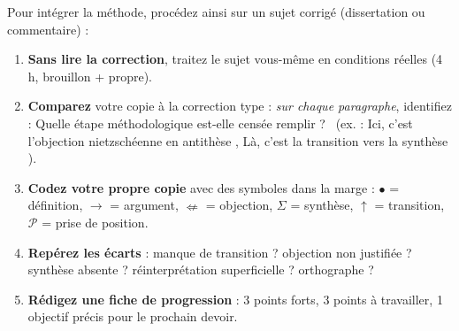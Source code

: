 \documentclass[11pt]{article}
\begin{document}
\begin{methode}
Pour intégrer la méthode, procédez ainsi sur un sujet corrigé (dissertation ou commentaire) :
\begin{enumerate}
    \item \textbf{Sans lire la correction}, traitez le sujet vous-même en conditions réelles (4 h, brouillon + propre).
    \item \textbf{Comparez} votre copie à la correction type : \emph{sur chaque paragraphe}, identifiez : \guillemotleft Quelle étape méthodologique est-elle censée remplir ? \guillemotright\ (ex. : \guillemotleft Ici, c'est l'objection nietzschéenne en antithèse \guillemotright, \guillemotleft Là, c'est la transition vers la synthèse \guillemotright).
    \item \textbf{Codez votre propre copie} avec des symboles dans la marge : $\bullet$ = définition, $\rightarrow$ = argument, $\nLeftarrow$ = objection, $\Sigma$ = synthèse, $\uparrow$ = transition, $\mathcal{P}$ = prise de position.
    \item \textbf{Repérez les écarts} : manque de transition ? objection non justifiée ? synthèse absente ? réinterprétation superficielle ? orthographe ?
    \item \textbf{Rédigez une \guillemotleft fiche de progression \guillemotright} : 3 points forts, 3 points à travailler, 1 objectif précis pour le prochain devoir.
\end{enumerate}
\end{methode}
\end{document}
